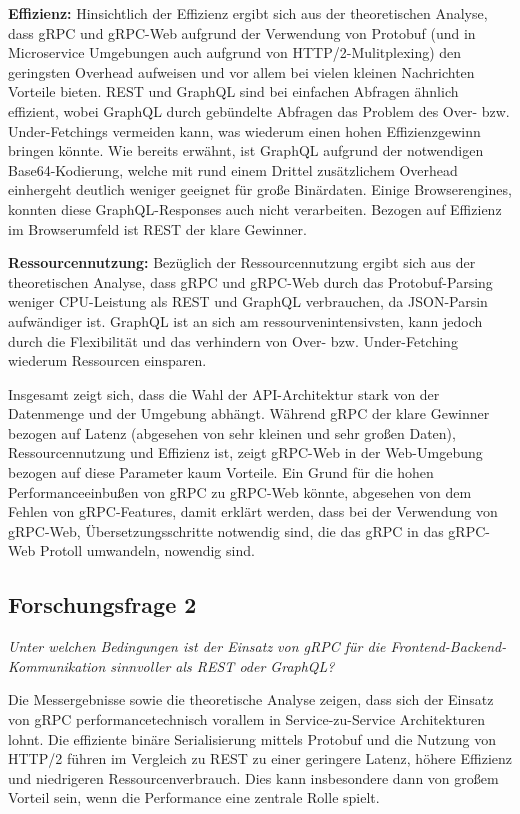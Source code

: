 \textbf{Effizienz:} 
Hinsichtlich der Effizienz ergibt sich aus der theoretischen Analyse, dass gRPC und gRPC-Web aufgrund der Verwendung von Protobuf (und in Microservice Umgebungen auch aufgrund von HTTP/2-Mulitplexing) den geringsten Overhead aufweisen und vor allem bei vielen kleinen Nachrichten Vorteile bieten. REST und GraphQL sind bei einfachen Abfragen ähnlich effizient, wobei GraphQL durch gebündelte Abfragen das Problem des Over- bzw. Under-Fetchings vermeiden kann, was wiederum einen hohen Effizienzgewinn bringen könnte. Wie bereits erwähnt, ist GraphQL aufgrund der notwendigen Base64-Kodierung, welche  mit rund einem Drittel zusätzlichem Overhead einhergeht deutlich weniger geeignet für große Binärdaten. Einige Browserengines, konnten diese GraphQL-Responses auch nicht verarbeiten. Bezogen auf Effizienz im Browserumfeld ist REST der klare Gewinner.

\textbf{Ressourcennutzung:} 
Bezüglich der Ressourcennutzung ergibt sich aus der theoretischen Analyse, dass gRPC und gRPC-Web durch das Protobuf-Parsing weniger CPU-Leistung als REST und GraphQL verbrauchen, da JSON-Parsin aufwändiger ist. GraphQL ist an sich am ressourvenintensivsten, kann jedoch durch die Flexibilität und das verhindern von Over- bzw. Under-Fetching wiederum Ressourcen einsparen.

Insgesamt zeigt sich, dass die Wahl der API-Architektur stark von der Datenmenge und der Umgebung abhängt. Während gRPC der klare Gewinner bezogen auf Latenz (abgesehen von sehr kleinen und sehr großen Daten), Ressourcennutzung und Effizienz ist, zeigt gRPC-Web in der Web-Umgebung bezogen auf diese Parameter kaum Vorteile. Ein Grund für die hohen Performanceeinbußen von gRPC zu gRPC-Web könnte, abgesehen von dem Fehlen von gRPC-Features, damit erklärt werden, dass bei der Verwendung von gRPC-Web, Übersetzungsschritte notwendig sind, die das gRPC in das gRPC-Web Protoll umwandeln, nowendig sind.

\subsection*{Forschungsfrage 2}
\textit{Unter welchen Bedingungen ist der Einsatz von gRPC für die Frontend-Backend-Kommunikation sinnvoller als REST oder GraphQL?}

Die Messergebnisse sowie die theoretische Analyse zeigen, dass sich der Einsatz von gRPC performancetechnisch vorallem in Service-zu-Service Architekturen lohnt. Die effiziente binäre Serialisierung mittels Protobuf und die Nutzung von HTTP/2  führen im Vergleich zu REST zu einer geringere Latenz, höhere Effizienz und niedrigeren Ressourcenverbrauch. Dies kann insbesondere dann von großem Vorteil sein, wenn die Performance eine zentrale Rolle spielt.

